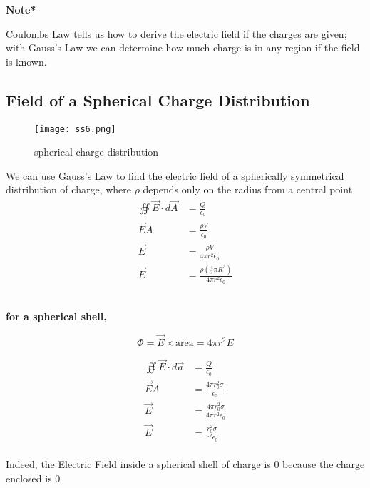 \documentclass[svgnames]{article}
\begin{document}
\textbf{Note*} 

Coulombs Law tells us how to derive the electric field if the charges are
given; with Gauss's Law we can determine how much charge is in any region if the field is known. 

\subsection{Field of a Spherical Charge Distribution} 

\vspace{20px}
\begin{figure}[!hb]
  \centering
  \texttt{[image: ss6.png]}
  \caption{spherical charge distribution} 
\end{figure}


\vspace{20px}
We can use Gauss's Law to find the electric field of a spherically symmetrical
distribution of charge, where $\rho$ depends only on the radius from a central point \\


\begin{align*}
\oiint \vec{E} \cdot d\vec{A} &= \frac{Q}{\epsilon_0} \\
\vec{E} A &= \frac{\rho V}{\epsilon_0} \\ 
\vec{E} &= \frac{\rho V}{4 \pi r^2 \epsilon_0} \\
\vec{E} &= \frac{\rho (\frac{4}{3}\pi R^3)}{4 \pi r^2 \epsilon_0}
\end{align*}\\
\begin{center}


\textbf{for a spherical shell,}
\end{center}

\[ \Phi = \vec{E} \times \text{area} = 4\pi r^2 E \] 

\begin{align*} 
\oiint \vec{E} \cdot d\vec{a} &= \frac{Q}{\epsilon_0} \\
\vec{E}A &= \frac{4\pi r_0^2 \sigma}{\epsilon_0} \\ 
\vec{E} &= \frac{4\pi r_0^2 \sigma}{4\pi r^2 \epsilon_0} \\ 
\vec{E} &= \frac{r_0^2 \sigma}{r^2 \epsilon_0}
\end{align*} \\


Indeed, the Electric Field inside a spherical shell of charge is 0 because the charge enclosed is 0 \\
\end{document}
